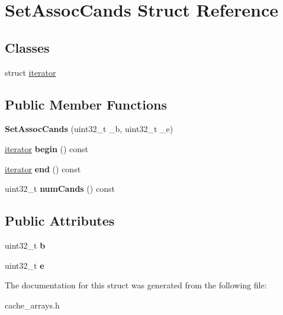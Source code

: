 \hypertarget{structSetAssocCands}{\section{Set\-Assoc\-Cands Struct Reference}
\label{structSetAssocCands}
}
\subsection*{Classes}
\begin{DoxyCompactItemize}
\item 
struct \hyperlink{structSetAssocCands_1_1iterator}{iterator}
\end{DoxyCompactItemize}
\subsection*{Public Member Functions}
\begin{DoxyCompactItemize}
\item 
\hypertarget{structSetAssocCands_abc75b9968cf5d046010b87584d039bdc}{{\bfseries Set\-Assoc\-Cands} (uint32\-\_\-t \-\_\-b, uint32\-\_\-t \-\_\-e)}\label{structSetAssocCands_abc75b9968cf5d046010b87584d039bdc}

\item 
\hypertarget{structSetAssocCands_a97210552bf6ee909606ffcfe6cfe8596}{\hyperlink{structSetAssocCands_1_1iterator}{iterator} {\bfseries begin} () const }\label{structSetAssocCands_a97210552bf6ee909606ffcfe6cfe8596}

\item 
\hypertarget{structSetAssocCands_abfeadb7feddbaa7fa90c1618b2d75040}{\hyperlink{structSetAssocCands_1_1iterator}{iterator} {\bfseries end} () const }\label{structSetAssocCands_abfeadb7feddbaa7fa90c1618b2d75040}

\item 
\hypertarget{structSetAssocCands_a701facbe2d312e18f6d149ba9dd7901f}{uint32\-\_\-t {\bfseries num\-Cands} () const }\label{structSetAssocCands_a701facbe2d312e18f6d149ba9dd7901f}

\end{DoxyCompactItemize}
\subsection*{Public Attributes}
\begin{DoxyCompactItemize}
\item 
\hypertarget{structSetAssocCands_ae143c28198fff50fbe143f0971cd50bf}{uint32\-\_\-t {\bfseries b}}\label{structSetAssocCands_ae143c28198fff50fbe143f0971cd50bf}

\item 
\hypertarget{structSetAssocCands_a6ebce25ce98f3658985d95b6c82690db}{uint32\-\_\-t {\bfseries e}}\label{structSetAssocCands_a6ebce25ce98f3658985d95b6c82690db}

\end{DoxyCompactItemize}


The documentation for this struct was generated from the following file\-:\begin{DoxyCompactItemize}
\item 
cache\-\_\-arrays.\-h\end{DoxyCompactItemize}
